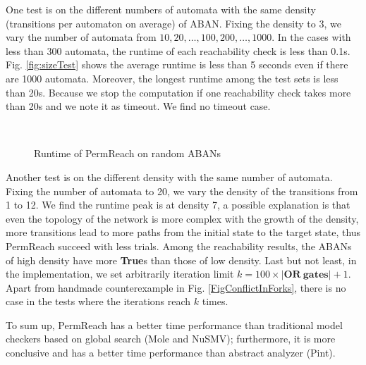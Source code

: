 \documentclass[runningheads]{llncs}
\begin{document}
One test is on the different numbers of automata with the same density (transitions per automaton on average) of ABAN. Fixing the density to 3, we vary the number of automata  from $10,20,\ldots,100,200,\ldots,1000$.
In the cases with less than 300 automata, the runtime of each reachability check is less than 0.1s.
Fig. \ref{fig:sizeTest} shows the average runtime is less than 5 seconds even if there are 1000 automata. 
Moreover, the longest runtime among the test sets is less than 20s. 
Because we stop the computation if one reachability check takes more than 20s and we note it as timeout.
We find no timeout case.

\begin{figure}[ht]
    ~
    \caption{Runtime of PermReach on random ABANs}
\end{figure}

Another test is on the different density with the same number of automata. 
Fixing the number of automata to 20, we vary the density of the transitions from 1 to 12.
We find the runtime peak is at density 7, a possible explanation is that even the topology of the network is more complex with the growth of the density, more transitions lead to more paths from the initial state to the target state, thus PermReach succeed with less trials.
Among the reachability results, the ABANs of high density have more \textbf{True}s than those of low density.
Last but not least, in the implementation, we set arbitrarily iteration limit $k=100\times|\mathbf{OR\  gates}|+1$. 
Apart from handmade counterexample in Fig. \ref{FigConflictInForks}, there is no case in the tests where the iterations reach $k$ times.


To sum up, PermReach has a better time performance than traditional model checkers based on global search (Mole and NuSMV); furthermore, it is more conclusive and has a better time performance than abstract analyzer (Pint).
\end{document}
